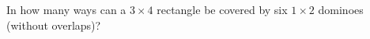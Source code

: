 In how many ways can a $3\times4$ rectangle be covered by six $1\times2$ dominoes (without overlaps)?
